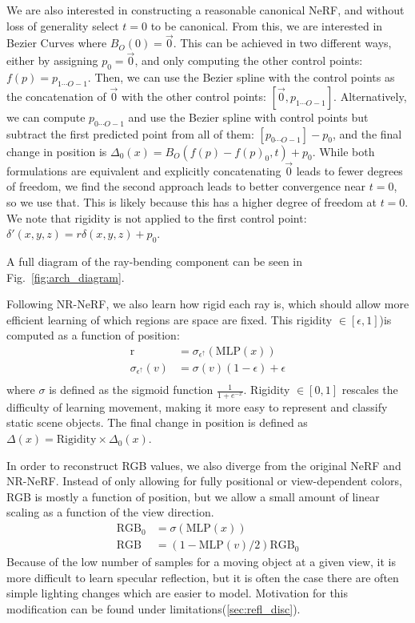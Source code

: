 We are also interested in constructing a reasonable canonical NeRF, and without loss of generality select $t = 0$ to be canonical. From this, we are interested in Bezier Curves where $B_O(0) = \overrightarrow{0}$. This can be achieved in two different ways, either by assigning $p_0 = \overrightarrow{0}$, and only computing the other control points: $f(p) = p_{1\cdots O-1}$. Then, we can use the Bezier spline with the control points as the concatenation of $\overrightarrow{0}$ with the other control points: $[\overrightarrow{0}, p_{1\cdots O-1}]$. Alternatively, we can compute $p_{0\cdots O-1}$ and use the Bezier spline with control points but subtract the first predicted point from all of them: $[p_{0\cdots O-1}]-p_0$, and the final change in position is $\Delta_0(x) = B_O(f(p)-f(p)_0,t)+p_0$. While both formulations are equivalent and explicitly concatenating $\overrightarrow{0}$ leads to fewer degrees of freedom, we find the second approach leads to better convergence near $t=0$, so we use that. This is likely because this has a higher degree of freedom at $t=0$. We note that rigidity is not applied to the first control point: $\delta'(x,y,z) = r\delta(x,y,z) + p_0$.

A full diagram of the ray-bending component can be seen in Fig.~\ref{fig:arch_diagram}.

Following NR-NeRF, we also learn how rigid each ray is, which should allow more efficient learning of which regions are space are fixed. This rigidity $\in[\epsilon, 1]$)is computed as a function of position:
\begin{align*}
  \text{r} &=\sigma_{\epsilon^\uparrow}(\text{MLP}(x)) \nonumber \\
  \sigma_{\epsilon^\uparrow}(v) &= \sigma(v)(1-\epsilon) + \epsilon \nonumber \\
\end{align*}
where $\sigma$ is defined as the sigmoid function $\frac{1}{1+e^{-x}}$. Rigidity $\in[0,1]$ rescales the
difficulty of learning movement, making it more easy to represent and classify static scene
objects. The final change in position is defined as $\Delta(x) = \text{Rigidity}\times
\Delta_0(x)$.

In order to reconstruct RGB values, we also diverge from the original NeRF and NR-NeRF. Instead of only allowing for fully positional or view-dependent colors, RGB is mostly a function of position, but we allow a small amount of linear scaling as a function of the view direction.
\begin{align}
  \text{RGB}_0 &= \sigma(\text{MLP}(x)) \nonumber \\
  \text{RGB} &= (1-\text{MLP}(v)/2)\text{RGB}_0 \nonumber
\end{align}
Because of the low number of
samples for a moving object at a given view, it is more difficult to learn specular
reflection, but it is often the case there are often simple lighting changes which are easier to model. Motivation for this modification can be found under limitations(\ref{sec:refl_disc}).

